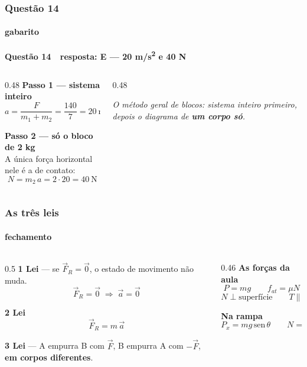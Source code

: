 \documentclass[aspectratio=169,12pt]{beamer}
\newcommand{\resposta}[2]{%
  \par\vspace{0.2em}
  {\Large\bfseries\color{vinho}Quest\~ao #1 \,\textemdash\, resposta: #2}
  \par\vspace{0.6em}}
\begin{document}
\begin{frame}
\frametitle{Quest\~ao 14}
\framesubtitle{gabarito}
\resposta{14}{E --- 20 m/s\textsuperscript{2} e 40 N}

\begin{columns}[T]
\begin{column}{0.48\textwidth}
\textbf{Passo 1 --- sistema inteiro}
\[ a = \frac{F}{m_1+m_2} = \frac{140}{7} = 20\ \text{m/s}^2 \]

\textbf{Passo 2 --- s\'o o bloco de 2 kg}\\
A \'unica for\c{c}a horizontal nele \'e a de contato:
\[ N = m_2\,a = 2\cdot 20 = 40\ \text{N} \]
\end{column}
\begin{column}{0.48\textwidth}
\centering
{}

\vspace{0.5em}
{\color{grafite}\itshape\small O m\'etodo geral de blocos: sistema
inteiro primeiro, depois o diagrama de \textbf{um corpo s\'o}.}
\end{column}
\end{columns}
\end{frame}

\begin{frame}
\frametitle{As tr\^es leis}
\framesubtitle{fechamento}

\begin{columns}[T]
\begin{column}{0.5\textwidth}
\textbf{1\textordfeminine{} Lei} --- se $\vec{F}_R = \vec{0}$, o estado
de movimento n\~ao muda.
\[ \vec{F}_R = \vec{0} \;\Rightarrow\; \vec{a} = \vec{0} \]

\textbf{2\textordfeminine{} Lei}
\[ \boxed{\vec{F}_R = m\,\vec{a}} \]

\textbf{3\textordfeminine{} Lei} --- A empurra B com $\vec{F}$, B
empurra A com $-\vec{F}$, \textbf{em corpos diferentes}.
\end{column}
\begin{column}{0.46\textwidth}
\textbf{As for\c{c}as da aula}
\[ P = mg \qquad f_{at} = \mu N \]
\[ N \perp \text{superf\'icie} \qquad T \parallel \text{fio} \]

\textbf{Na rampa}
\[ P_x = mg\,\mathrm{sen}\,\theta \qquad
   N = mg\cos\theta \]

\vspace{0.5em}
\end{column}
\end{columns}
\end{frame}
\end{document}
